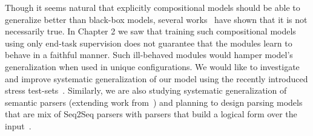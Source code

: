 \documentclass[main.tex]{subfiles}
\begin{document}
Though it seems natural that explicitly compositional models should be able to generalize better than black-box models, several works~\cite{sys-generalization-2018,closure-generalization-2020} have shown that it is not necessarily true.  In Chapter 2 we saw that training such compositional models using only end-task supervision does not guarantee that the modules learn to behave in a faithful manner.  Such ill-behaved modules would hamper model's generalization when used in unique configurations.
 We would like to investigate and improve systematic generalization of our model using the recently introduced stress test-sets~\cite{contrast-sets-2020}. Similarly, we are also studying systematic generalization of semantic parsers (extending work from~) and planning to design parsing models that are mix of Seq2Seq parsers with  parsers that build a logical form over the input~\cite{zettlemoyer-pccg,pasupat-liang-2015,gupta-ncds-2018}.
















\biblio
\end{document}
